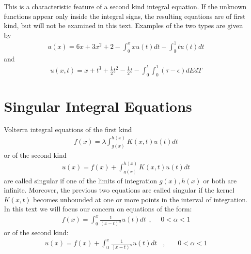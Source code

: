 \documentclass[11pt]{report}
\newcommand{\NI}{\noindent}
\begin{document}
	\NI This is a characteristic feature of a second kind integral equation. If the unknown functions appear only inside the integral signs, the resulting equations are of first kind, but will not be examined in this text. Examples of the two types are given by
	\begin{eqnarray}
		u(x) = 6x + 3x^2 + 2 - \int_{0}^{x} xu(t)dt - \int_{0}^{1} tu(t)dt\label{eq:2_3}
	\end{eqnarray}
	and
	\begin{eqnarray}
		u(x,t) = x + t^3 + \frac{1}{2} t^2 - \frac{1}{2} t - \int_{0}^{t} \int_{0}^{1} (\tau - \epsilon)dEdT\label{eq:2_4}
	\end{eqnarray}
	
	\section{Singular Integral Equations}
	Volterra integral equations of the first kind 
	\begin{eqnarray}
		f(x) = \lambda \int_{g(x)}^{h(x)} K(x,t)u(t)dt\label{eq:2_5}
	\end{eqnarray}
	or of the second kind
	\begin{eqnarray}
		u(x) = f(x) + \int_{g(x)}^{h(x)} K(x,t)u(t)dt\label{eq:2_6}
	\end{eqnarray}
	are called singular if one of the limits of integration $g(x), h(x)$ or both are infinite. Moreover, the previous two equations are called singular if the kernel $K(x,t)$ becomes unbounded at one or more points in the interval of integration. In this text we will focus our concern on equations of the form:
	\begin{eqnarray}
		f(x) =\int_{0}^{x} \frac{1}{(x - t)^\alpha} u(t)dt ~~, ~~~~~~0 < \alpha < 1
	\end{eqnarray}
	or of the second kind:
	\begin{eqnarray}
		u(x) = f(x) +\int_{0}^{x} \frac{1}{(x - t)^ \alpha} u(t)dt ~~~~,   ~~~~~~~~ 0 < \alpha < 1
	\end{eqnarray}
	
\end{document}
